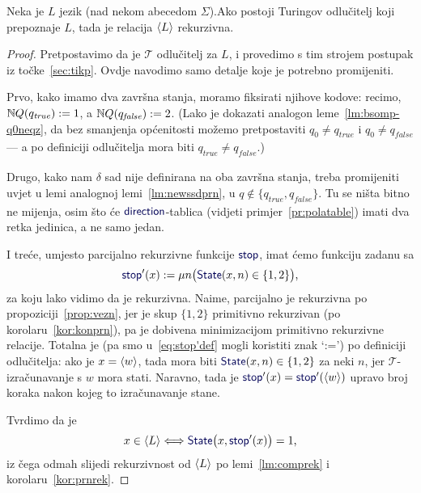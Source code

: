 \begin{teorem}[{name=[rekurzivnost Turing-odlučivog jezika]}]\label{tm:oikr}
    Neka je $L$ jezik (nad nekom abecedom $\Sigma$).\newline Ako postoji Turingov odlučitelj koji prepoznaje $L$, tada je relacija $\langle L\rangle$ rekurzivna.
\end{teorem}
\begin{proof}
Pretpostavimo da je $\mathcal T$ odlučitelj za $L$, i provedimo s tim strojem postupak iz točke~\ref{sec:tikp}. Ovdje navodimo samo detalje koje je potrebno promijeniti.

Prvo, kako imamo dva završna stanja, moramo fiksirati njihove kodove: recimo, ${\mathbb N} Q(q_\mathit{true}):=1$, a ${\mathbb N} Q(q_\mathit{false}):=2$. (Lako je dokazati analogon leme~\ref{lm:bsomp-q0neqz}, da bez smanjenja općenitosti možemo pretpostaviti $q_0\ne q_\mathit{true}$ i $q_0\ne q_\mathit{false}$ --- a po definiciji odlučitelja mora biti $q_\mathit{true}\ne q_\mathit{false}$.)

    Drugo, kako nam $\delta$ sad nije definirana na oba završna stanja, treba promijeniti uvjet u lemi analognoj lemi~\ref{lm:newssdprn}, u $q\notin\{q_\mathit{true},q_\mathit{false}\}$. Tu se ništa bitno ne mijenja, osim što će $\f{direction}$-tablica (vidjeti primjer~\ref{pr:polatable}) imati dva retka jedinica, a ne samo jedan.

I treće, umjesto parcijalno rekurzivne funkcije $\f{stop}$, imat ćemo funkciju zadanu sa
\begin{equation}\label{eq:stop'def}
    \f{stop}'(x):=\mu n\bigl(\f{State}(x,n)\in\{1,2\}\bigr)\text,
\end{equation}
za koju lako vidimo da je rekurzivna. Naime, parcijalno je rekurzivna po propoziciji~\ref{prop:vezn}, jer je skup $\{1,2\}$ primitivno rekurzivan (po korolaru~\ref{kor:konprn}), pa je dobivena minimizacijom primitivno rekurzivne relacije. Totalna je (pa smo u~\eqref{eq:stop'def} mogli koristiti znak `:=') po definiciji odlučitelja: ako je $x=\langle w\rangle$, tada mora biti $\f{State}(x,n)\in\{1,2\}$ za neki $n$, jer $\mathcal T$-izračunavanje s $w$ mora stati.
Naravno, tada je $\f{stop}'(x)=\f{stop}'(\kr w)$ upravo broj koraka nakon kojeg to iz\-ra\-ču\-na\-va\-nje stane.

Tvrdimo da je
\begin{equation}
    x\in\kr L\Longleftrightarrow\f{State}\bigl(x,\f{stop}'(x)\bigr)=1\text,
\end{equation}
iz čega odmah slijedi rekurzivnost od $\langle L\rangle$ po lemi~\ref{lm:comprek} i korolaru~\ref{kor:prnrek}. 


\end{proof}
